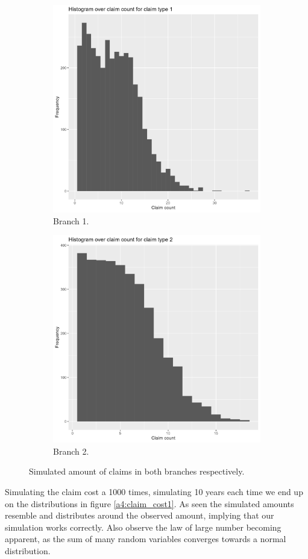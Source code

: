 \documentclass[11pt]{article}
\begin{document}
\begin{figure}[h!]
    \begin{subfigure}{.49\textwidth}
        \centering
        \includegraphics[width=.6\linewidth]{plots/simulation/histogram_claim_count1.png}
        \caption{Branch 1.}
    \end{subfigure}
    \begin{subfigure}{.49\textwidth}
        \centering
        \includegraphics[width=.6\linewidth]{plots/simulation/histogram_claim_count2.png}
        \caption{Branch 2.}
    \end{subfigure}
    \label{a4:claimcount}
    \caption{Simulated amount of claims in both branches respectively.}
\end{figure}

Simulating the claim cost a 1000 times, simulating 10 years each time we end up on the distributions in figure \ref{a4:claim_cost1}.
As seen the simulated amounts resemble and distributes around the observed amount, implying that our simulation works correctly.
Also observe the law of large number becoming apparent, as the sum of many random variables converges towards a normal distribution.
\end{document}
